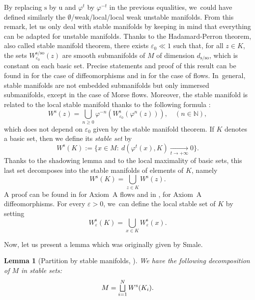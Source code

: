 \documentclass[11pt]{article}
\let\oldbigsqcup\bigsqcup
\renewcommand{\bigsqcup}{\mathop{\textstyle\oldbigsqcup}\displaylimits}
\newcommand{\rs}{\mathrm{s}}
\newcommand{\rso}{\mathrm{so}}
\newcommand{\ru}{\mathrm{u}}
\theoremstyle{definition}
\theoremstyle{plain}
\newtheorem{lemma}[definition]{Lemma}
\newcommand{\N}{\mathbb{N}}
\begin{document}
By replacing $\rs$ by $\ru$ and $\varphi^t$ by $\varphi^{-t}$ in the previous equalities, we~could have defined similarly the $\emptyset$/weak/local/local weak unstable manifolds. From this remark, let us only deal with stable manifolds by keeping in mind that everything can be adapted for unstable manifolds. Thanks to the Hadamard-Perron theorem, also called stable manifold theorem, there exists $\varepsilon_0 \ll 1$ such that, for all $z \in K$, the sets $W_{\varepsilon_0}^{\rs/\rso} (z)$ are smooth submanifolds of $M$ of dimension $d_{\rs/\rso}$, which is constant on each basic set. Precise statements and proof of this result can be found in \cite[Th.\,6.4.9, p.\,267]{katok-hasselblatt} for the case of diffeomorphisms and in \cite[Th.\,5, p.\,34]{dyatlov} for the case of flows. In~general, stable manifolds are not embedded submanifolds but only immersed submanifolds, except in the case of Morse flows. Moreover, the stable manifold is related to the local stable manifold thanks to the following formula \cite[p.\,24]{dyatlov}:
\[
W^\rs (z) = \bigcup_{n \geq 0} \varphi^{-n} \left(W_{\varepsilon_0}^\rs (\varphi^{n} (z)) \right), \quad (n \in \N),
\]
which does not depend on $\varepsilon_0$ given by the stable manifold theorem. If $K$ denotes a basic set, then we define its \textit{stable set} by
\[
W^{\rs} (K):= \{ x \in M: \: d(\varphi^{ t} (x), K) \underset{t \to +\infty}{\to} 0 \}.
\]
Thanks to the shadowing lemma \cite[Th.\,18.1.6 p.\,569]{katok-hasselblatt} and to the local maximality of basic sets, this last set decomposes into the stable manifolds of elements of $K$, namely
\[
W^\rs (K) = \bigcup_{z \in K} W^\rs (z).
\]
A proof can be found in \cite[Th.\,5.3.25]{FH} for Axiom~A flows and in \cite[Prop.\,3.10, p.\,53]{bowen3}, \cite[Th.\,6.26, p.\,131]{wen} for Axiom~A diffeomorphisms. For every $\varepsilon >0$, we~can define the local stable set of $K$ by setting
\begin{equation}\label{eq: local decomposition of the stable manifold of a basic set}
W_{\varepsilon}^\rs (K) = \bigcup_{x \in K} W_{\varepsilon}^\rs (x).
\end{equation}

Now, let us present a lemma which was originally given by Smale.

\begin{lemma}[{Partition by stable manifolds, \cite[Cor.\,II.5.3]{smale} }]\label{lemma: spectral decomposition of the manifold} We have the following decomposition of $M$ in stable sets:
\begin{equation} \label{partition of the manifold in stable manifolds}
M = \bigsqcup_{i = 1}^N W^\rs (K_i).
\end{equation}
\end{lemma}
\end{document}
